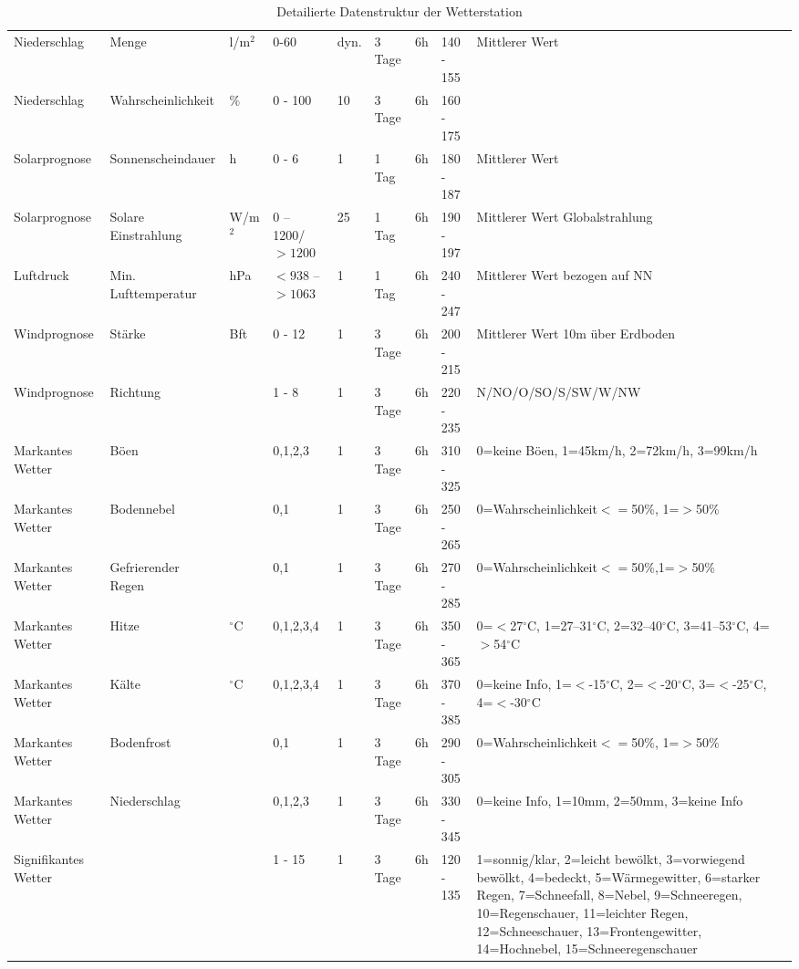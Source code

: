 \begin{table}[!b]
{\begin{minipage}[!b]{\textwidth}
{{\begin{tabular}[!b]{| p{2.5cm} | l | l | l | l | l | l | l | p{6.4cm} |}
Niederschlag & Menge & l/m$^2$ &  0-60 & dyn. & 3 Tage & 6h & 140 - 155 & Mittlerer Wert\\
Niederschlag & Wahrscheinlichkeit & \% &  0 - 100 & 10 & 3 Tage & 6h & 160 - 175 & \\
Solarprognose & Sonnenscheindauer & h &  0 - 6 & 1 & 1 Tag & 6h & 180 - 187 & Mittlerer Wert\\
Solarprognose & Solare Einstrahlung & W/m$^2$ &  0 – 1200/$>1200$ & 25 & 1 Tag & 6h & 190 - 197 & Mittlerer Wert Globalstrahlung\\
Luftdruck & Min. Lufttemperatur & hPa &  $<938$ – $>1063$ & 1 & 1 Tag & 6h & 240 - 247 & Mittlerer Wert bezogen auf NN\\
Windprognose & Stärke & Bft &  0 - 12 & 1 & 3 Tage & 6h & 200 - 215 & Mittlerer Wert 10m über Erdboden\\
Windprognose & Richtung &  &  1 - 8 & 1 & 3 Tage & 6h & 220 - 235 & N/NO/O/SO/S/SW/W/NW\\
Markantes Wetter & Böen &  &  0,1,2,3 & 1 & 3 Tage & 6h & 310 - 325 & 0=keine Böen, 1=45km/h, 2=72km/h, 3=99km/h \\
Markantes Wetter & Bodennebel &  & 0,1 & 1 & 3 Tage & 6h & 250 - 265 & 0=Wahrscheinlichkeit$<=$50\%, 1=$>$50\%\\
Markantes Wetter & Gefrierender Regen &  & 0,1 & 1 & 3 Tage & 6h & 270 - 285 & 0=Wahrscheinlichkeit$<=$50\%,1=$>$50\%\\
Markantes Wetter & Hitze & $^\circ$C &  0,1,2,3,4 & 1 & 3 Tage & 6h & 350 - 365 & 0=$<$27$^\circ$C, 1=27–31$^\circ$C, 2=32–40$^\circ$C, 3=41–53$^\circ$C, 4=$>$54$^\circ$C\\
Markantes Wetter & Kälte & $^\circ$C &  0,1,2,3,4 & 1 & 3 Tage & 6h & 370 - 385 & 0=keine Info, 1=$<$-15$^\circ$C, 2=$<$-20$^\circ$C, 3=$<$-25$^\circ$C, 4=$<$-30$^\circ$C\\
Markantes Wetter & Bodenfrost &  &  0,1 & 1 & 3 Tage & 6h & 290 - 305 & 0=Wahrscheinlichkeit$<=$50\%, 1=$>$50\%\\
Markantes Wetter & Niederschlag &  &  0,1,2,3 & 1 & 3 Tage & 6h & 330 - 345 & 0=keine Info, 1=10mm, 2=50mm, 3=keine Info\\
Signifikantes Wetter &  &  & 1 - 15 & 1 & 3 Tage & 6h & 120 - 135 & 1=sonnig/klar, 2=leicht bewölkt, 3=vorwiegend bewölkt, 4=bedeckt, 5=Wärmegewitter, 6=starker Regen, 7=Schneefall, 8=Nebel, 9=Schneeregen, 10=Regenschauer, 11=leichter Regen, 12=Schneeschauer, 13=Frontengewitter, 14=Hochnebel, 15=Schneeregenschauer\\
\hline
\end{tabular}
}
}
\caption{Detailierte Datenstruktur der Wetterstation\cite[S. 17-26]{HKWDoc}}
\label{tab:detaildatenstruktur}
\end{minipage}
}
\end{table}
\FloatBarrier
